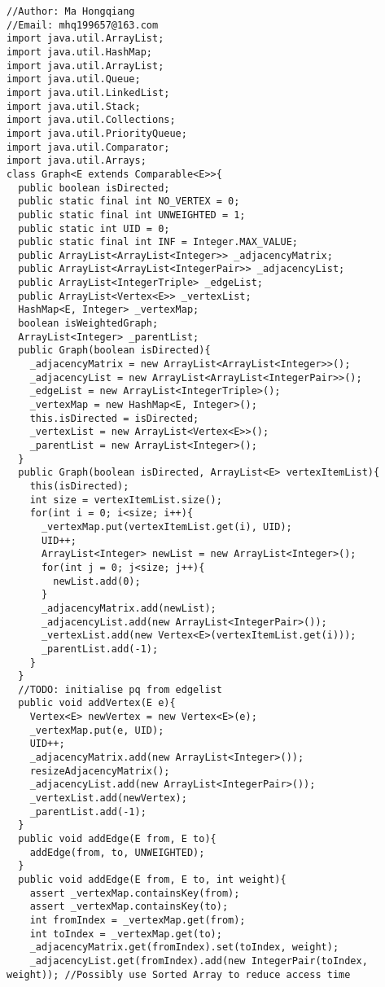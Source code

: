 \documentclass[11pt]{article}
\theoremstyle{definition}
\begin{document}

\begin{verbatim}
//Author: Ma Hongqiang
//Email: mhq199657@163.com
import java.util.ArrayList;
import java.util.HashMap;
import java.util.ArrayList;
import java.util.Queue;
import java.util.LinkedList;
import java.util.Stack;
import java.util.Collections;
import java.util.PriorityQueue;
import java.util.Comparator;
import java.util.Arrays;
class Graph<E extends Comparable<E>>{
  public boolean isDirected;
  public static final int NO_VERTEX = 0;
  public static final int UNWEIGHTED = 1;
  public static int UID = 0;
  public static final int INF = Integer.MAX_VALUE;
  public ArrayList<ArrayList<Integer>> _adjacencyMatrix;
  public ArrayList<ArrayList<IntegerPair>> _adjacencyList;
  public ArrayList<IntegerTriple> _edgeList;
  public ArrayList<Vertex<E>> _vertexList;
  HashMap<E, Integer> _vertexMap;
  boolean isWeightedGraph;
  ArrayList<Integer> _parentList;
  public Graph(boolean isDirected){
    _adjacencyMatrix = new ArrayList<ArrayList<Integer>>();
    _adjacencyList = new ArrayList<ArrayList<IntegerPair>>();
    _edgeList = new ArrayList<IntegerTriple>();
    _vertexMap = new HashMap<E, Integer>();
    this.isDirected = isDirected;
    _vertexList = new ArrayList<Vertex<E>>();
    _parentList = new ArrayList<Integer>();
  }
  public Graph(boolean isDirected, ArrayList<E> vertexItemList){
    this(isDirected);
    int size = vertexItemList.size();
    for(int i = 0; i<size; i++){
      _vertexMap.put(vertexItemList.get(i), UID);
      UID++;
      ArrayList<Integer> newList = new ArrayList<Integer>();
      for(int j = 0; j<size; j++){
        newList.add(0);
      }
      _adjacencyMatrix.add(newList);
      _adjacencyList.add(new ArrayList<IntegerPair>());
      _vertexList.add(new Vertex<E>(vertexItemList.get(i)));
      _parentList.add(-1);
    }
  }
  //TODO: initialise pq from edgelist
  public void addVertex(E e){
    Vertex<E> newVertex = new Vertex<E>(e);
    _vertexMap.put(e, UID);
    UID++;
    _adjacencyMatrix.add(new ArrayList<Integer>());
    resizeAdjacencyMatrix();
    _adjacencyList.add(new ArrayList<IntegerPair>());
    _vertexList.add(newVertex);
    _parentList.add(-1);
  }
  public void addEdge(E from, E to){
    addEdge(from, to, UNWEIGHTED);
  }
  public void addEdge(E from, E to, int weight){
    assert _vertexMap.containsKey(from);
    assert _vertexMap.containsKey(to);
    int fromIndex = _vertexMap.get(from);
    int toIndex = _vertexMap.get(to);
    _adjacencyMatrix.get(fromIndex).set(toIndex, weight);
    _adjacencyList.get(fromIndex).add(new IntegerPair(toIndex, weight)); //Possibly use Sorted Array to reduce access time

\end{verbatim}
\end{document}
